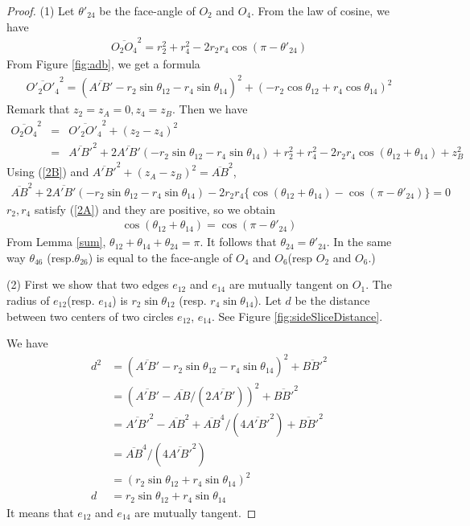 \documentclass[suppldata, dvipdfmx]{interact}
\theoremstyle{plain}%
\theoremstyle{definition}
\theoremstyle{remark}
\theoremstyle{problemstyle}
\begin{document}
 
\begin{proof}
 (1) Let $\theta'_{24}$ be the face-angle of $O_2$ and $O_4$. From the
 law of cosine, we have
 \begin{align}
  \overline{O_2O_4}^2 = r_2^2 + r_4^2 - 2r_2r_4\cos(\pi-\theta'_{24}) \tag{2.B}\label{2B}
 \end{align}
From Figure \ref{fig:adb}, we get a formula
\begin{eqnarray*}
 \overline{O'_2O'_4}^2 = (\overline{A'B'} - r_2\sin\theta_{12}-
  r_4\sin\theta_{14})^2 + (-r_2\cos\theta_{12} + r_4 \cos \theta_{14})^2
\end{eqnarray*}
 Remark that $z_2 = z_A= 0, z_4 = z_B$. Then we have
\begin{eqnarray*}
 \overline{O_2O_4}^2 &=& \overline{O'_2O'_4}^2 + (z_2-z_4)^2\\
 &=&\overline{A'B'}^2 + 2 \overline{A'B'}(-r_2\sin\theta_{12} -
  r_4\sin\theta_{14}) + r^2_2 + r^2_4 -2r_2r_4\cos(\theta_{12} +
  \theta_{14}) + z^2_B
\end{eqnarray*}
Using (\ref{2B}) and $\overline{A'B'}^2 + (z_A-z_B)^2 = \overline{AB}^2$,
\begin{eqnarray*}
 \overline{AB}^2 + 2\overline{A'B'}(-r_2\sin\theta_{12} -
  r_4\sin\theta_{14}) - 2r_2r_4\{\cos(\theta_{12} + \theta_{14}) -
  \cos(\pi- \theta'_{24})\} = 0
\end{eqnarray*}
 $r_2, r_4$ satisfy (\ref{2A}) and they are positive, so we obtain
\begin{eqnarray*}
 \cos(\theta_{12} + \theta_{14}) = \cos(\pi - \theta'_{24})
\end{eqnarray*}
From Lemma \ref{sum}, $\theta_{12} + \theta_{14} + \theta_{24} = \pi$. It
 follows that $\theta_{24} = \theta'_{24}$. In the same way $\theta_{46}$
 (resp.$\theta_{26}$) is equal to the face-angle of $O_4$ and $O_6$(resp
 $O_2$ and $O_6$.)

(2) First we show that two edges $e_{12}$ and $e_{14}$ are mutually tangent
 on $O_1$. The radius of $e_{12}$(resp. $e_{14}$) is
 $r_2\sin\theta_{12}$ (resp. $r_4\sin\theta_{14}$). Let $d$ be the
 distance between two centers of two circles $e_{12}$, $e_{14}$. See
 Figure \ref{fig:sideSliceDistance}.

We have
 \begin{align*}
d^2&= (\overline{A'B'} - r_2\sin\theta_{12}-r_4\sin\theta_{14})^2 + \overline{BB'}^2\\
&= (\overline{A'B'} - \overline{AB}/(2\overline{A'B'}))^2 + \overline{BB'}^2\\
&= \overline{A'B'}^2 - \overline{AB}^2
  +\overline{AB}^4/(4\overline{A'B'}^2) + \overline{BB'}^2\\
&= \overline{AB}^4 / (4 \overline{A'B'}^2)\\
&=(r_2\sin\theta_{12} + r_4\sin\theta_{14})^2\\
d&= r_2\sin\theta_{12} + r_4\sin\theta_{14}
 \end{align*}
It means that $e_{12}$ and $e_{14}$ are mutually tangent.


\end{proof}
\end{document}
